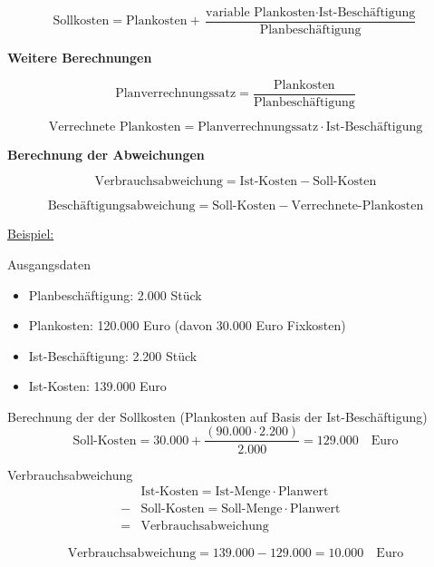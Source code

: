 \documentclass[a4paper,11pt, twoside]{article}
\begin{document}
\begin{equation}
 \text{Sollkosten} =  \text{Plankosten} + \frac{\text{variable Plankosten} \cdot \text{Ist-Beschäftigung}}{\text{Planbeschäftigung}} 
\end{equation}

\textbf{Weitere Berechnungen}

\begin{equation}
 \text{Planverrechnungssatz} = \frac{\text{Plankosten}}{\text{Planbeschäftigung}} 
\end{equation}

\begin{equation}
 \text{Verrechnete Plankosten} = \text{Planverrechnungssatz} \cdot \text{Ist-Beschäftigung} 
\end{equation}

\textbf{Berechnung der Abweichungen}

\begin{equation}
 \text{Verbrauchsabweichung} = \text{Ist-Kosten} - \text{Soll-Kosten} 
\end{equation}

\begin{equation}
 \text{Beschäftigungsabweichung} = \text{Soll-Kosten} - \text{Verrechnete-Plankosten} 
\end{equation}

\underline{Beispiel:}

Ausgangsdaten
\begin{itemize}
	\item Planbeschäftigung: 2.000 Stück
	\item Plankosten: 120.000 Euro (davon 30.000 Euro Fixkosten)
	\item Ist-Beschäftigung: 2.200 Stück
	\item Ist-Kosten: 139.000 Euro
\end{itemize}

Berechnung der der Sollkosten (Plankosten auf Basis der Ist-Beschäftigung)
\[
\text{Soll-Kosten} = 30.000 + \frac{(90.000 \cdot 2.200)}{2.000} = 129.000 \quad \text{Euro}
\]

Verbrauchsabweichung
\[
\begin{aligned}
 & \text{Ist-Kosten} = \text{Ist-Menge} \cdot \text{Planwert}\\
 - & \text{Soll-Kosten} = \text{Soll-Menge} \cdot \text{Planwert}\\\hline
 = & \text{Verbrauchsabweichung}
 & \end{aligned}
\]

\[
\text{Verbrauchsabweichung} = 139.000 - 129.000 = 10.000 \quad \text{Euro}
\]
\end{document}
